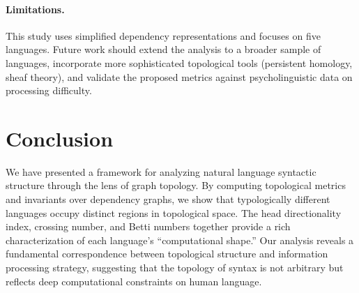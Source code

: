 \documentclass[11pt,a4paper]{article}
\begin{document}
\paragraph{Limitations.}
This study uses simplified dependency representations and focuses on
five languages. Future work should extend the analysis to a broader
sample of languages, incorporate more sophisticated topological tools
(persistent homology, sheaf theory), and validate the proposed metrics
against psycholinguistic data on processing difficulty.

\section{Conclusion}
\label{sec:conclusion}

We have presented a framework for analyzing natural language syntactic
structure through the lens of graph topology. By computing topological
metrics and invariants over dependency graphs, we show that
typologically different languages occupy distinct regions in topological
space. The head directionality index, crossing number, and Betti
numbers together provide a rich characterization of each language's
``computational shape.'' Our analysis reveals a fundamental
correspondence between topological structure and information processing
strategy, suggesting that the topology of syntax is not arbitrary but
reflects deep computational constraints on human language.



\end{document}
